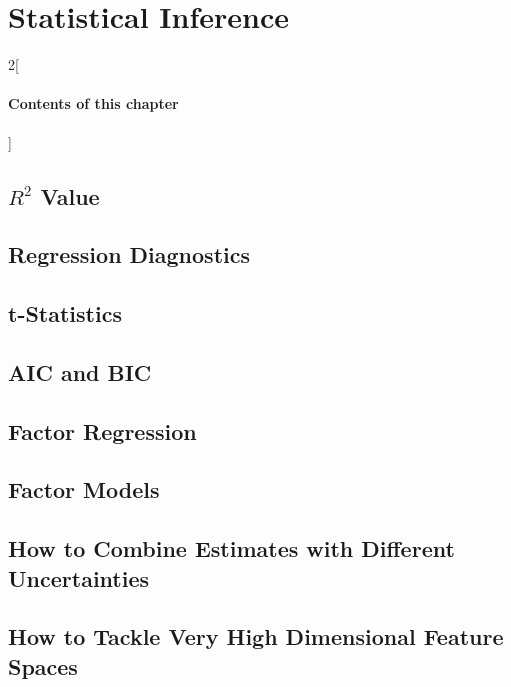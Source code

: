 \chapter{Statistical Inference}
\label{sec:directionalstats}

\begin{multicols}{2}[\subsubsection*{Contents of this chapter}]
\end{multicols}















\section{$R^2$ Value}

\section{Regression Diagnostics}

\section{t-Statistics}

\section{AIC and BIC}

\section{Factor Regression}

\section{Factor Models}


\section{How to Combine Estimates with Different Uncertainties}

\section{How to Tackle Very High Dimensional Feature Spaces}

